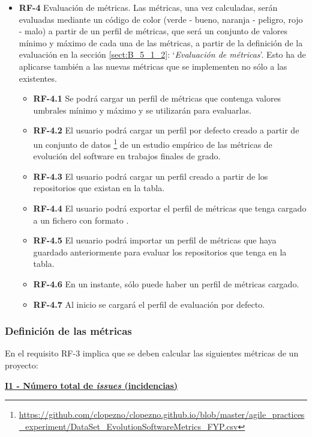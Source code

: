 \begin{itemize}
\begin{itemize}
	\end{itemize}
	\item \textbf{RF-4} Evaluación de métricas. Las métricas, una vez calculadas, serán evaluadas mediante un código de color (verde - bueno, naranja - peligro, rojo - malo) a partir de un perfil de métricas, que será un conjunto de valores mínimo y máximo de cada una de las métricas, a partir de la definición de la evaluación en la sección \ref{sect:B_5_1_2}: `\textit{Evaluación de métricas}'. Esto ha de aplicarse también a las nuevas métricas que se implementen no sólo a las existentes.
	\begin{itemize}
		\item \textbf{RF-4.1} Se podrá cargar un perfil de métricas que contenga valores umbrales mínimo y máximo y se utilizarán para evaluarlas.
		\item \textbf{RF-4.2} El usuario podrá cargar un perfil por defecto creado a partir de un conjunto de datos \footnote{\url{https://github.com/clopezno/clopezno.github.io/blob/master/agile_practices_experiment/DataSet_EvolutionSoftwareMetrics_FYP.csv}} de un estudio empírico de las métricas de evolución del software en trabajos finales de grado\cite{lopez_nozal_measuring_2019}.
		\item \textbf{RF-4.3} El usuario podrá cargar un perfil creado a partir de los repositorios que existan en la tabla.
		\item \textbf{RF-4.4} El usuario podrá exportar el perfil de métricas que tenga cargado a un fichero con formato .
		\item \textbf{RF-4.5} El usuario podrá importar un perfil de métricas que haya guardado anteriormente para evaluar los repositorios que tenga en la tabla.
		\item \textbf{RF-4.6} En un instante, sólo puede haber un perfil de métricas cargado.
		\item \textbf{RF-4.7} Al inicio se cargará el perfil de evaluación por defecto.
	\end{itemize}
\end{itemize}

\subsubsection{Definición de las métricas}\label{sect:B_5_1_1}

En el requisito RF-3 implica que se deben calcular las siguientes métricas de un proyecto:

\textbf{\underline{I1 - Número total de \textit{issues} (incidencias)}}

